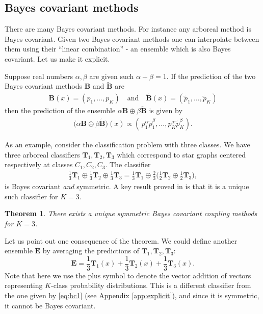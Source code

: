 \documentclass[twoside,11pt]{article}
\newtheorem{thm}{Theorem}
\begin{document}
\subsection{Bayes covariant methods}

There are many Bayes covariant methods. For instance any arboreal method is Bayes covariant. Given two Bayes covariant methods one can interpolate between them using their ``linear combination'' - an ensemble which is also Bayes covariant. Let us make it explicit.

 Suppose real numbers $\alpha, \beta$ are given such $\alpha + \beta = 1$. If the prediction of the two Bayes covariant methods $\boldsymbol{B}$ and $\boldsymbol{\tilde B}$ are
\begin{align*}
	\boldsymbol{B}(x) = (p_1, \ldots, p_K)\quad\textrm{and}\quad \boldsymbol{\tilde B}(x) = (\tilde p_1, \ldots, \tilde p_K)
\end{align*}
then the prediction of the ensemble $\alpha 	\boldsymbol{B} \oplus \beta \boldsymbol{\tilde B}$ is given by
\begin{align*}
	\bigl(\alpha 	\boldsymbol{B} \oplus \beta \boldsymbol{\tilde B}\bigr)(x)\propto (\,p_1^\alpha \tilde p_1^\beta, \ldots, p_K^\alpha \tilde p_K^\beta).
\end{align*}

As an example, consider the classification problem with three classes. We have three arboreal classifiers $\boldsymbol{T}_1, \boldsymbol{T}_2, \boldsymbol{T}_3$ which correspond to star graphs centered respectively at classes $C_1, C_2, C_3$. The classifier 
\begin{align}
\frac13 \boldsymbol{T}_1 \oplus \frac13 \boldsymbol{T}_2 \oplus \frac 13 \boldsymbol{T}_3 = \frac13 \boldsymbol{T}_1 \oplus \frac23 \biggl(\frac12 \boldsymbol{T}_2 \oplus \frac 12 \boldsymbol{T}_3
\biggr), \label{eq:bc1}
\end{align}
is Bayes covariant \emph{and} symmetric. A key result proved in \cite{vsuch2016bayes} is that it is a unique such classifier for $K=3$.

\begin{thm}
	There exists a unique symmetric Bayes covariant coupling methods for $K=3$.
\end{thm}

Let us point out one consequence of the theorem. We could define another ensemble $\boldsymbol{E}$ by averaging the predictions of $\boldsymbol{T}_1, \boldsymbol{T}_2, \boldsymbol{T}_3$:
\[
\boldsymbol{E} = \frac13 \boldsymbol{T}_1(x) + \frac13 \boldsymbol{T}_2(x) + \frac 13 \boldsymbol{T}_3(x).
\]
Note that here we use the plus symbol to denote the vector addition of vectors representing $K$-class probability distributions. This is a different classifier from the one given by  \eqref{eq:bc1} (see Appendix \ref{app:explicit}), and since it is symmetric, it cannot be Bayes covariant.
\end{document}
